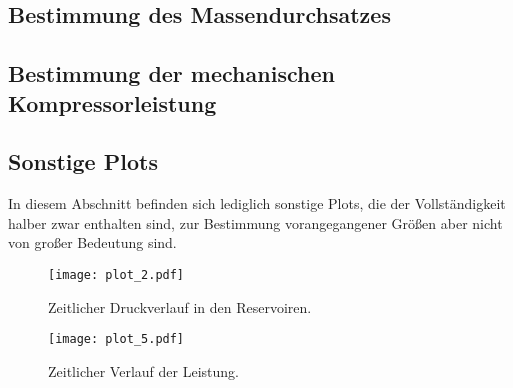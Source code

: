 \subsection{Bestimmung des Massendurchsatzes}

\subsection{Bestimmung der mechanischen Kompressorleistung}


\subsection{Sonstige Plots}

In diesem Abschnitt befinden sich lediglich sonstige Plots, die der Vollständigkeit halber zwar enthalten sind, zur 
Bestimmung vorangegangener Größen aber nicht von großer Bedeutung sind.


\begin{figure}
  \centering
  \texttt{[image: plot\_2.pdf]}
  \caption{Zeitlicher Druckverlauf in den Reservoiren.}
  \label{fig:plot3}
\end{figure}


\begin{figure}
  \centering
  \texttt{[image: plot\_5.pdf]}
  \caption{Zeitlicher Verlauf der Leistung.}
  \label{fig:plot5}
\end{figure}

